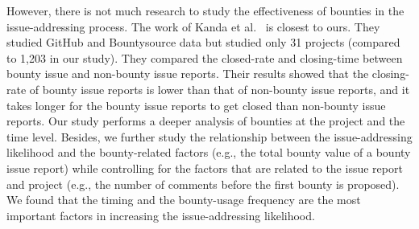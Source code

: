 However, there is not much research to study the effectiveness of bounties in the issue-addressing process.
The work of Kanda et al.~\cite{kanda2017towards} is closest to ours. They studied GitHub and Bountysource data but studied only 31 projects (compared to 1,203 in our study). They compared the closed-rate and closing-time between bounty issue and non-bounty issue reports. Their results showed that the closing-rate of bounty issue reports is lower than that of non-bounty issue reports, and it takes longer for the bounty issue reports to get closed than non-bounty issue reports.
Our study performs a deeper analysis of bounties at the project and the time level. Besides, we further study the relationship between the issue-addressing likelihood and the bounty-related factors (e.g., the total bounty value of a bounty issue report) while controlling for the factors that are related to the issue report and project (e.g., the number of comments before the first bounty is proposed). We found that the timing and the bounty-usage frequency are the most important factors in increasing the issue-addressing likelihood.


